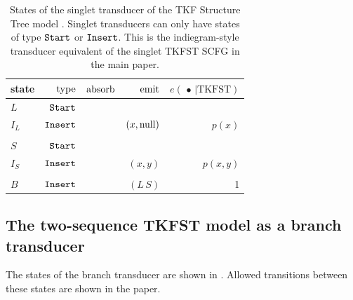 \documentclass[10pt]{article}
\begin{document}
\begin{table}[!ht]
  \centering
  \begin{tabular}{lrrrr}
    state & $\operatorname{type}$ & $\operatorname{absorb}$ & $\operatorname{emit}$ & $e(\,\bullet\,|\mathrm{TKFST})$ \\ \hline
    $L$ & $\mathtt{Start}$ \\
    $I_L$ & $\mathtt{Insert}$ & & $(x,\mathrm{null})$ & $p(x)$ \\
    \\
    $S$ & $\mathtt{Start}$ \\
    $I_S$ & $\mathtt{Insert}$ & & $(x,y)$ & $p(x,y)$ \\
    \\
    $B$ & $\mathtt{Insert}$ & & $(L\,S)$ & 1 \\
  \end{tabular}
  \caption{
    States of the singlet transducer of the TKF Structure Tree model \cite{Holmes2004}.
    Singlet transducers can only have states of type $\mathtt{Start}$ or $\mathtt{Insert}$.
    This is the indiegram-style transducer equivalent of the singlet TKFST SCFG in the main paper.
  }
\end{table}


\subsection{The two-sequence TKFST model as a branch transducer}

The states of the branch transducer are shown in .
Allowed transitions between these states are shown in the paper.
\end{document}

